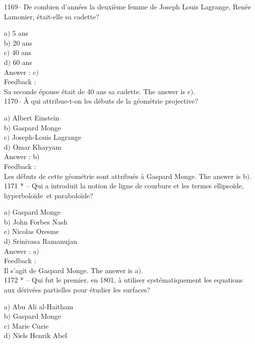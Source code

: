 ﻿\documentclass[letterpaper, 12pt]{article}
\begin{document}
1169-- De combien d'ann\'ees la deuxi\`eme femme de Joseph Louis
Lagrange, Ren\'ee Lamonier, \'etait-elle sa cadette?

a$)$ 5 ans \\
b$)$ 20 ans \\
c$)$ 40 ans \\
d$)$ 60 ans\\

Answer : c$)$\\

Feedback : \\
Sa seconde \'epouse \'etait de 40 ans sa cadette.
The answer is c$)$.\\

1170-- \`A qui attribue-t-on les d\'ebuts de la g\'eom\'etrie
projective?

a$)$ Albert Einstein \\
b$)$ Gaspard Monge \\
c$)$ Joseph-Louis Lagrange \\
d$)$ Omar Khayyam\\

Answer : b$)$\\

Feedback : \\
Les d\'ebuts de cette g\'eom\'etrie sont attribu\'es \`a Gaspard
Monge.
The answer is b$)$.\\

1171 * -- Qui a introduit la notion de ligne de courbure et les
termes \og ellipso\"ide\fg , \og hyperbolo\"ide\fg\ et \og
parabolo\"ide\fg ?

a$)$ Gaspard Monge \\
b$)$ John Forbes Nash \\
c$)$ Nicolas Oresme \\
d$)$ Srinivasa Ramanujan\\

Answer : a$)$\\

Feedback : \\
Il s'agit de Gaspard Monge.
The answer is a$)$.\\

1172 * -- Qui fut le premier, en 1801, \`a utiliser
syst\'ematiquement les equations aux d\'eriv\'ees partielles pour
\'etudier les surfaces?

a$)$ Abu Ali al-Haitham \\
b$)$ Gaspard Monge \\
c$)$ Marie Curie \\
d$)$ Niels Henrik Abel\\
\end{document}
